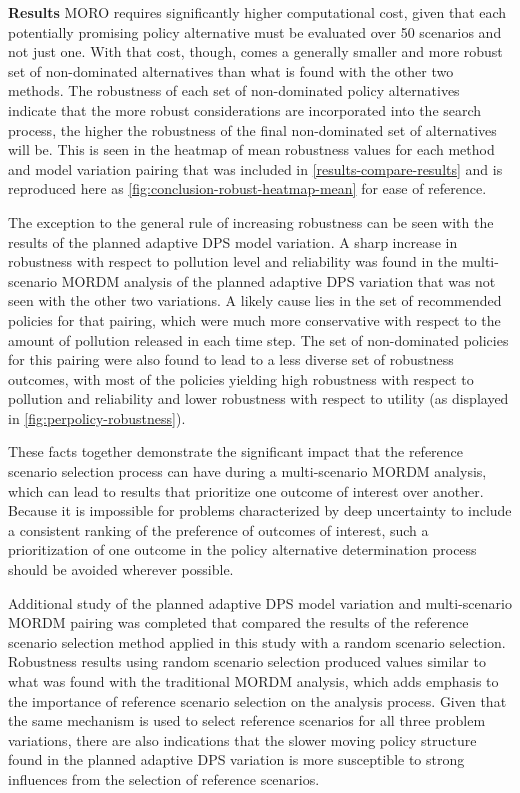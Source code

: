         \textbf{Results} \newline
        MORO requires significantly higher computational cost, given that each potentially promising policy alternative must be evaluated over 50 scenarios and not just one. With that cost, though, comes a generally smaller and more robust set of non-dominated alternatives than what is found with the other two methods. The robustness of each set of non-dominated policy alternatives indicate that the more robust considerations are incorporated into the search process, the higher the robustness of the final non-dominated set of alternatives will be. This is seen in the heatmap of mean robustness values for each method and model variation pairing that was included in \cref{results-compare-results} and is reproduced here as \cref{fig:conclusion-robust-heatmap-mean} for ease of reference.
        
        The exception to the general rule of increasing robustness can be seen with the results of the planned adaptive DPS model variation. A sharp increase in robustness with respect to pollution level and reliability was found in the multi-scenario MORDM analysis of the planned adaptive DPS variation that was not seen with the other two variations. A likely cause lies in the set of recommended policies for that pairing, which were much more conservative with respect to the amount of pollution released in each time step. The set of non-dominated policies for this pairing were also found to lead to a less diverse set of robustness outcomes, with most of the policies yielding high robustness with respect to pollution and reliability and lower robustness with respect to utility (as displayed in \cref{fig:perpolicy-robustness}).
        
        These facts together demonstrate the significant impact that the reference scenario selection process can have during a multi-scenario MORDM analysis, which can lead to results that prioritize one outcome of interest over another. Because it is impossible for problems characterized by deep uncertainty to include a consistent ranking of the preference of outcomes of interest, such a prioritization of one outcome in the policy alternative determination process should be avoided wherever possible.
        
        Additional study of the planned adaptive DPS model variation and multi-scenario MORDM pairing was completed that compared the results of the reference scenario selection method applied in this study with a random scenario selection. Robustness results using random scenario selection produced values similar to what was found with the traditional MORDM analysis, which adds emphasis to the importance of reference scenario selection on the analysis process. Given that the same mechanism is used to select reference scenarios for all three problem variations, there are also indications that the slower moving policy structure found in the planned adaptive DPS variation is more susceptible to strong influences from the selection of reference scenarios. 
      
